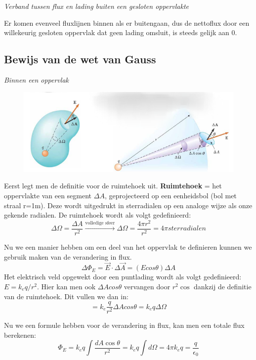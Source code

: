 \documentclass[12pt,a4paper]{article}
\begin{document}
   	\textit{Verband tussen flux en lading buiten een gesloten oppervlakte}
   	
   	Er komen evenveel fluxlijnen binnen als er buitengaan, dus de nettoflux door een willekeurig gesloten oppervlak dat geen lading omsluit, is steeds gelijk aan 0.
   	
   	\subsection{Bewijs van de wet van Gauss}
   	\textit{Binnen een oppervlak}
   	\begin{figure}[h]
   		\centering
   		\includegraphics[width=0.7\linewidth]{bewijs_gauss}
   		\label{fig:bewijsgauss}
   	\end{figure}
   Eerst legt men de definitie voor de ruimtehoek uit. \textbf{Ruimtehoek} = het oppervlakte van een segment $\Delta A$, geprojecteerd op een eenheidsbol (bol met straal r=1m). Deze wordt uitgedrukt in sterradialen op een analoge wijze als onze gekende radialen. De ruimtehoek wordt als volgt gedefinieerd:
   \[\Delta\Omega = \frac{\Delta A}{r^2} \xrightarrow{\text{volledige sfeer}} \Delta\Omega = \frac{4\pi r^2}{r^2} = 4\pi sterradialen\]
   
   Nu we een manier hebben om een deel van het oppervlak te definieren kunnen we gebruik maken van de verandering in flux.
   \[\Delta\Phi_E = \vec{E}\cdot\Delta\vec{A} = (Ecos\theta)\Delta A\]
   Het elektrisch veld opgewekt door een puntlading wordt als volgt gedefinieerd: \(E = k_eq/r^2\). Hier kan men ook $\Delta A cos\theta$ vervangen door $r^2\cos$ dankzij de definitie van de ruimtehoek. Dit vullen we dan in:
   \[= k_e\frac{q}{r^2}\Delta A cos\theta = k_eq\Delta\Omega\]
   
   Nu we een formule hebben voor de verandering in flux, kan men een totale flux berekenen: 
   \[\Phi_E = k_eq\int \frac{dA\cos\theta}{r^2} = k_eq\int d\Omega = 4\pi k_e q = \frac{q}{\epsilon_0}\]
   
\end{document}
